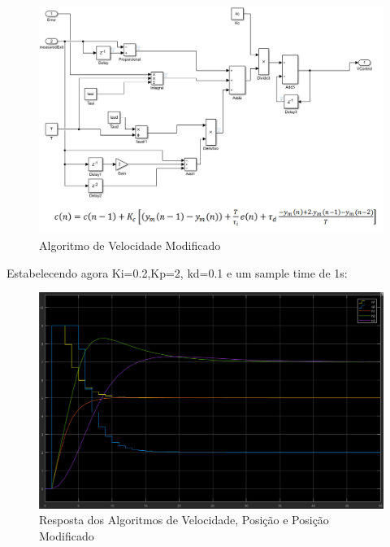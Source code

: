 \documentclass[11pt]{article}
\begin{document}
\begin{figure}[!htbp]
	\centering
      		 \includegraphics[page=1,width=1\textwidth]{img/pid.png} 
		\caption{Algoritmo de Velocidade Modificado}	
		\label{fig:dois}
\end{figure}

\newpage

Estabelecendo agora Ki=0.2,Kp=2, kd=0.1 e um sample time de 1s:

\begin{figure}[!htbp]
	\centering
      		 \includegraphics[page=1,width=1\textwidth]{img/new.png} 
		\caption{Resposta dos Algoritmos de Velocidade, Posição e Posição Modificado}	
		\label{pos}
\end{figure}
\end{document}
